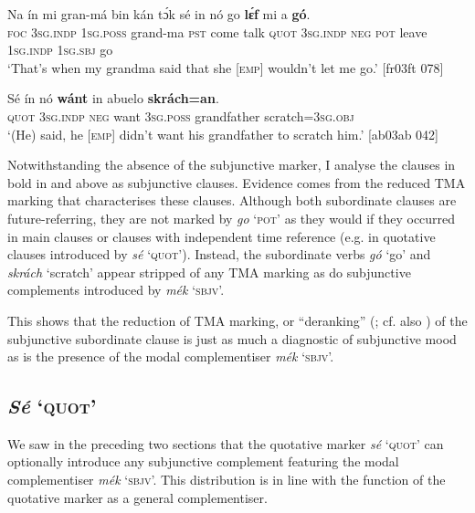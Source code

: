 \ea%
    \label{ex:key:1403}
    \gll Na  ín    mi    gran-má    bin  kán    tɔ́k  sé
in    nó  go  \textbf{lɛ́f}    mi    a    \textbf{gó}.\\
\textsc{foc}  \textsc{3sg.indp}  \textsc{1sg.poss}  grand-ma  \textsc{pst}  come  talk  \textsc{quot}
\textsc{3sg.indp}  \textsc{neg}  \textsc{pot}  leave  \textsc{1sg.indp}  \textsc{1sg.sbj}  go\\

\glt ‘That’s when my grandma said that she [\textsc{emp}] wouldn’t let me go.’ [fr03ft 078]
\z


\ea%
    \label{ex:key:1404}
    \gll Sé    ín    nó  \textbf{wánt}  {in}    {abuelo}    \textbf{skrách}\textbf{\textmd{=an}}.\\
\textsc{quot}    \textsc{3sg.indp}  \textsc{neg}  want  \textsc{3sg.poss}  grandfather  scratch=\textsc{3sg.obj}\\

\glt ‘(He) said, he [\textsc{emp}] didn’t want his grandfather to scratch him.’ [ab03ab 042]
\z

Notwithstanding the absence of the subjunctive marker, I analyse the clauses in bold in  and  above as subjunctive clauses. Evidence comes from the reduced TMA marking that characterises these clauses. Although both subordinate clauses are future-referring, they are not marked by \textit{go} ‘\textsc{pot}’ as they would if they occurred in main clauses or clauses with independent time reference (e.g. in quotative clauses introduced by \textit{sé} ‘\textsc{quot}’). Instead, the subordinate verbs \textit{gó} ‘go’ and \textit{skrách} ‘scratch’ appear stripped of any TMA marking as do subjunctive complements introduced by \textit{mék} ‘\textsc{sbjv}’. 


This shows that the reduction of TMA marking, or “deranking” (\citealt[76–86]{Stassen1985}; cf. also \citealt{Cristofaro2003}) of the subjunctive subordinate clause is just as much a diagnostic of subjunctive mood as is the presence of the modal complementiser \textit{mék} ‘\textsc{sbjv}’. 


\subsection{\textit{Sé} ‘\textsc{quot}’}\label{sec:10.5.6}

We saw in the preceding two sections that the quotative marker \textit{sé} ‘\textsc{quot}’ can optionally introduce any subjunctive complement featuring the modal complementiser \textit{mék} ‘\textsc{sbjv}’. This distribution is in line with the function of the quotative marker as a general complementiser. 


